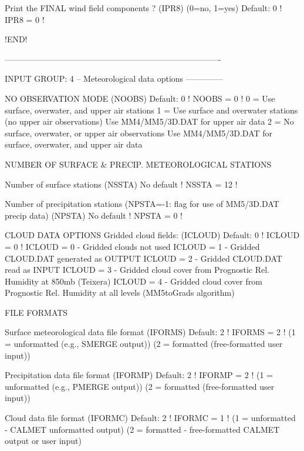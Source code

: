 \documentclass[a4paper,10pt]{article}
\begin{document}
          Print the FINAL wind field components ?
          (IPR8) (0=no, 1=yes)             Default: 0       !  IPR8 =  0  !

!END!


-------------------------------------------------------------------------------

INPUT GROUP: 4 -- Meteorological data options
--------------

    NO OBSERVATION MODE             (NOOBS)  Default: 0     ! NOOBS =  0   !
          0 = Use surface, overwater, and upper air stations
          1 = Use surface and overwater stations (no upper air observations)
              Use MM4/MM5/3D.DAT for upper air data
          2 = No surface, overwater, or upper air observations
              Use MM4/MM5/3D.DAT for surface, overwater, and upper air data

    NUMBER OF SURFACE & PRECIP. METEOROLOGICAL STATIONS

       Number of surface stations   (NSSTA)  No default     ! NSSTA =  12  !

       Number of precipitation stations
       (NPSTA=-1: flag for use of MM5/3D.DAT precip data)
                                    (NPSTA)  No default     ! NPSTA =  0  !

    CLOUD DATA OPTIONS
       Gridded cloud fields:
                                   (ICLOUD)  Default: 0     ! ICLOUD =  0  !
       ICLOUD = 0 - Gridded clouds not used
       ICLOUD = 1 - Gridded CLOUD.DAT generated as OUTPUT
       ICLOUD = 2 - Gridded CLOUD.DAT read as INPUT
       ICLOUD = 3 - Gridded cloud cover from Prognostic Rel. Humidity
                    at 850mb (Teixera)
       ICLOUD = 4 - Gridded cloud cover from Prognostic Rel. Humidity
                    at all levels (MM5toGrads algorithm)

    FILE FORMATS

       Surface meteorological data file format
                                   (IFORMS)  Default: 2     ! IFORMS =  2  !
       (1 = unformatted (e.g., SMERGE output))
       (2 = formatted   (free-formatted user input))

       Precipitation data file format
                                   (IFORMP)  Default: 2     ! IFORMP =  2  !
       (1 = unformatted (e.g., PMERGE output))
       (2 = formatted   (free-formatted user input))

       Cloud data file format
                                   (IFORMC)  Default: 2     ! IFORMC =  1  !
       (1 = unformatted - CALMET unformatted output)
       (2 = formatted   - free-formatted CALMET output or user input)
\end{document}

